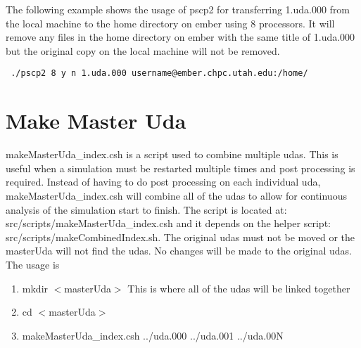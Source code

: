 The following example shows the usage of pscp2 for transferring 1.uda.000 from the local machine to the home directory on ember using 8 processors. It will remove any files in the home directory on ember with the same title of 1.uda.000 but the original copy on the local machine will not be removed.

\begin{Verbatim}
 ./pscp2 8 y n 1.uda.000 username@ember.chpc.utah.edu:/home/
\end{Verbatim}

\section{Make Master Uda}
makeMasterUda\_index.csh is a script used to combine multiple udas. This is useful when a simulation must be restarted multiple times and post processing is required. Instead of having to do post processing on each individual uda, makeMasterUda\_index.csh will combine all of the udas to allow for continuous analysis of the simulation start to finish.  The script is located at: src/scripts/makeMasterUda\_index.csh and it depends on the helper script: src/scripts/makeCombinedIndex.sh. The original udas must not be moved or the  masterUda will not find the udas. No changes will be made to the original udas.
\\
The usage is 
\begin{enumerate}
\item mkdir $<$masterUda$>$ This is where all of the udas will be linked together
\item cd $<$masterUda$>$
\item makeMasterUda\_index.csh ../uda.000 ../uda.001 ../uda.00N
\end{enumerate}

